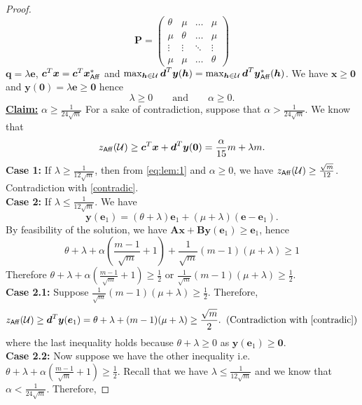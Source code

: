 \documentclass[11pt]{article}
\theoremstyle{plain}
\theoremstyle{definition}
\numberwithin{equation}{section}%
\numberwithin{equation}{section}%
\newcommand{\mb}[1]{\ensuremath{\boldsymbol{#1}}}
\begin{document}
\begin{appendix}
{\begin{proof}
\begin{equation} \label{matrix:P}
 \mb P= \left(
\begin{matrix}
\theta &  \mu & \ldots & \mu \\
\mu &  \theta & \ldots & \mu \\
\vdots & \vdots & \ddots & \vdots\\
\mu  &   \mu    &\ldots & \theta
\end{matrix}
\right)
\end{equation}
 $ \mb q = \lambda \mb e$, $\mb c^T \mb x= \mb c^T \mb x^*_{\sf Aff}$  and  $\max_{ \mb h \in {\cal U}} \mb d^T \mb y(\mb h)= \max_{ \mb h \in {\cal U}} \mb d^T \mb y^*_{\sf Aff}(\mb h)$.  We have $ \mb x \geq \mb 0$ and $ \mb y(\mb 0) = \lambda \mb e \geq \mb 0$ hence
\begin{equation}\label{eq:lambda}
\lambda \geq 0 \qquad \text{and}   \qquad \alpha \geq 0.
\end{equation}
\noindent
\underline{\bf Claim:} $\alpha \geq \frac{1}{24 \sqrt{m}}$
For a sake of contradiction, suppose that $ \alpha > \frac{1}{24 \sqrt{m}}$. We know that
\begin{equation}\label{eq:lem:1}
z_{\sf Aff}({\cal U}) \geq \mb c^T \mb x + \mb d^T \mb y( \mb 0) =  \frac{\alpha}{15} m + \lambda m.
\end{equation}
{\bf Case 1:} If $\lambda \geq \frac{1}{12 \sqrt{m}}$, then from \eqref{eq:lem:1} and $\alpha \geq 0$, we have $z_{\sf Aff}({\cal U}) \geq \frac{\sqrt{m}}{12}$. Contradiction with \eqref{contradic}.\\
{\bf Case 2:} If $ \lambda \leq \frac{1}{12 \sqrt{m}}$. We have
$$ \mb y( \mb e_1) = ( \theta+ \lambda ) \mb e_1 + ( \mu+ \lambda) ( \mb e -  \mb e_1).$$
By feasibility of the solution, we have $\mb A \mb x+ \mb B \mb y ( \mb e_1) \geq \mb e_1$, hence
$$ \theta+ \lambda +  \alpha \left( \frac{m-1}{\sqrt{m}} +1 \right)+\frac{1}{\sqrt{m}} (m-1)(\mu+ \lambda ) \geq 1$$
Therefore $\theta+ \lambda +  \alpha \left( \frac{m-1}{\sqrt{m}} +1 \right) \geq \frac{1}{2}$ or $\frac{1}{\sqrt{m}} (m-1)(\mu + \lambda) \geq \frac{1}{2}$.\\
{\bf Case 2.1:} Suppose $\frac{1}{\sqrt{m}} (m-1)(\mu + \lambda ) \geq \frac{1}{2}$.
Therefore,
$$ z_{\sf Aff}({\cal U}) \geq \mb d^T \mb y (\mb e_1) = \theta+ \lambda + (m-1)(\mu+ \lambda) \geq \frac{\sqrt{m}}{2}. \; \; (\text{Contradiction with \eqref{contradic}})$$
where the last inequality holds because $\theta+ \lambda \geq 0 $ as $\mb y( \mb e_1) \geq \mb 0$.\\
{\bf Case 2.2:} Now suppose we have the other inequality i.e. $\theta+ \lambda +  \alpha \left( \frac{m-1}{\sqrt{m}} +1 \right) \geq \frac{1}{2}$. Recall that we have $ \lambda \leq \frac{1}{12\sqrt{m}}$ and we know that $ \alpha < \frac{1}{24 \sqrt{m}}$. Therefore,

\end{proof}}
\end{appendix}
\end{document}
